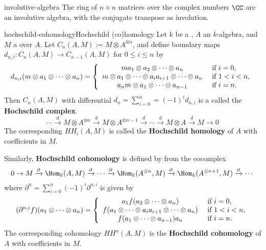 \begin{example}{involutive-algebra}
    The ring of $n \times n$ matrices over the complex numbers $\CC$ are an involutive algebra, with the conjugate transpose as involution.
\end{example}

\begin{topic}{hochschild-cohomology}{Hochschild (co)homology}
    Let $k$ be a , $A$ an $k$-algebra, and $M$ a  over $A$. Let $C_n(A, M) := M \otimes A^{\otimes n}$, and define boundary maps $d_{n, i} : C_n(A, M) \to C_{n - 1}(A, M)$ for $0 \le i \le n$ by
    \[ d_{n, i}(m \otimes a_1 \otimes \cdots \otimes a_n) = \left\{ \begin{array}{cl}
        m a_1 \otimes a_2 \otimes \cdots \otimes a_n & \textup{ if } i = 0, \\
         m \otimes a_1 \otimes \cdots \otimes a_i a_{i + 1} \otimes \cdots \otimes a_n & \textup{ if } 1 < i < n , \\
        a_n m \otimes a_1 \otimes \cdots \otimes a_{n - 1} & \textup{ if } i = n .
    \end{array} \right. \]
    Then $C_n(A, M)$ with differential $d_n = \sum_{i = 0}^{n} = (-1)^i d_{n, i}$ is a  called the \textbf{Hochschild complex}.
    \[ \cdots \xrightarrow{d} M \otimes A^{\otimes n} \xrightarrow{d} M \otimes A^{\otimes n - 1} \xrightarrow{d} \cdots \xrightarrow{d} M \otimes A \xrightarrow{d} M \to 0 \]
    The corresponding  $HH_i(A, M)$ is called the \textbf{Hochschild homology} of $A$ with coefficients in $M$.
    
    Similarly, \textbf{Hochschild cohomology} is defined by from the cocomplex
    \[ 0 \to M \xrightarrow{\partial} \Hom_k(A, M) \xrightarrow{\partial} \cdots \xrightarrow{\partial} \Hom_k(A^{\otimes n}, M) \xrightarrow{\partial} \Hom_k(A^{\otimes n + 1}, M) \xrightarrow{\partial} \cdots \]
    where $\partial^n = \sum_{i = 0}^n (-1)^i \partial^{n, i}$ is given by
    \[ (\partial^{n, i} f)(a_1 \otimes \cdots \otimes a_n) = \left\{ \begin{array}{cl}
        a_1 f(a_2 \otimes \cdots \otimes a_n)  & \textup{ if } i = 0, \\
         f(a_1 \otimes \cdots \otimes a_i a_{i + 1} \otimes \cdots \otimes a_n) & \textup{ if } 1 < i < n, \\
        f(a_1 \otimes \cdots \otimes a_{n - 1}) a_n & \textup{ if } i = n .
    \end{array} \right. \]
    The corresponding cohomology $HH^n(A, M)$ is the \textbf{Hochschild cohomology} of $A$ with coefficients in $M$.
\end{topic}

